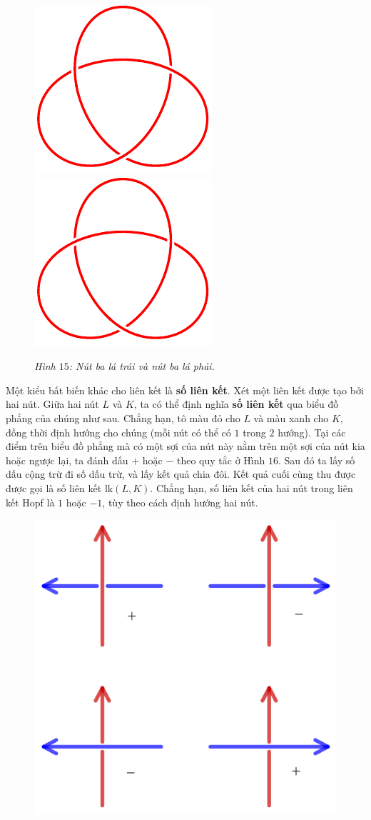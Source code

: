 \begin{multicols}{2}
\begin{figure}[H]
		\centering
		\captionsetup{labelformat= empty, justification=centering}
		\includegraphics[width= 0.36\linewidth]{trefoil.pdf}\quad\quad
		\includegraphics[width= 0.36\linewidth]{mirror trefoil.pdf}
		\caption{\small\textit{\color{duongvaotoanhoc}Hình $15$: Nút ba lá trái và nút ba lá phải.}}
		\vspace*{-10pt}
	\end{figure}
	Một kiểu bất biến khác cho liên kết là {\bf\color{duongvaotoanhoc} số liên kết}. Xét một liên kết được tạo bởi hai nút. Giữa hai nút $L$ và $K$, ta có thể định nghĩa {\bf\color{duongvaotoanhoc} số liên kết} qua biểu đồ phẳng của chúng như sau. Chẳng hạn, tô màu đỏ cho $L$ và màu xanh cho $K$, đồng thời định hướng cho chúng (mỗi nút có thể có $1$ trong $2$ hướng). Tại các điểm trên biểu đồ phẳng mà có một sợi của nút này nằm trên một sợi của nút kia hoặc ngược lại, ta đánh dấu $+$ hoặc $-$ theo quy tắc ở Hình $16$. Sau đó ta lấy số dấu cộng trừ đi số dấu trừ, và lấy kết quả chia đôi. Kết quả cuối cùng thu được được gọi là số liên kết $\text{lk}(L,K)$. Chẳng hạn, số liên kết của hai nút trong liên kết Hopf là $1$ hoặc $-1$, tùy theo cách định hướng hai nút.
	\begin{figure}[H]
		\vspace*{-5pt}
		\centering
		\captionsetup{labelformat= empty, justification=centering}
		\includegraphics[width= 0.6\linewidth]{h16}

\end{figure}
\end{multicols}
